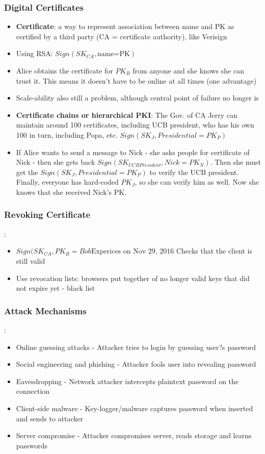 \documentclass{article}
\begin{document}
\subsubsection{Digital Certificates}
\begin{itemize}
\item \textbf{Certificate}: a way to represent association between name and PK as certified by a third party (CA = certificate authority), like Verisign
\item Using RSA: $Sign(SK_{CA},\textrm{name=PK})$
\item Alice obtains the certificate for $PK_B$ from anyone and she knows she can trust it. This means it doesn't have to be online at all times (one advantage)
\item Scale-ability also still a problem, although central point of failure no longer is
\item \textbf{Certificate chains or hierarchical PKI}: The Gov. of CA Jerry can maintain around 100 certificates, including UCB president, who has his own 100 in turn, including Popa, etc. $Sign(SK_J, Presidential=PK_P)$
\item If Alice wants to send a message to Nick - she asks people for certificate of Nick - then she gets back $Sign(SK_{UCB President}, Nick=PK_N)$. Then she must get the $Sign(SK_J, Presidential=PK_P)$ to verify the UCB president. Finally, everyone has hard-coded $PK_J$, so she can verify him as well. Now she knows that she received Nick's PK.
\end{itemize}

\subsubsection{Revoking Certificate}: 
\begin{itemize}
\item $Sign(SK_{CA}, PK_B=Bob\textrm{Experices on Nov 29, 2016}$ Checks that the client is still valid
\item Use revocation lists: browsers put together of no longer valid keys that did not expire yet - black list
\end{itemize}

\subsubsection{Attack Mechanisms}:
\begin{itemize}
\item Online guessing attacks - Attacker tries to login by guessing user?s password
\item Social engineering and phishing - Attacker fools user into revealing password
\item Eavesdropping - Network attacker intercepts plaintext password on the
connection
\item Client-side malware - Key-logger/malware captures password when
inserted and sends to attacker
\item Server compromise - Attacker compromises server, reads storage and learns passwords
\end{itemize}
\end{document}
